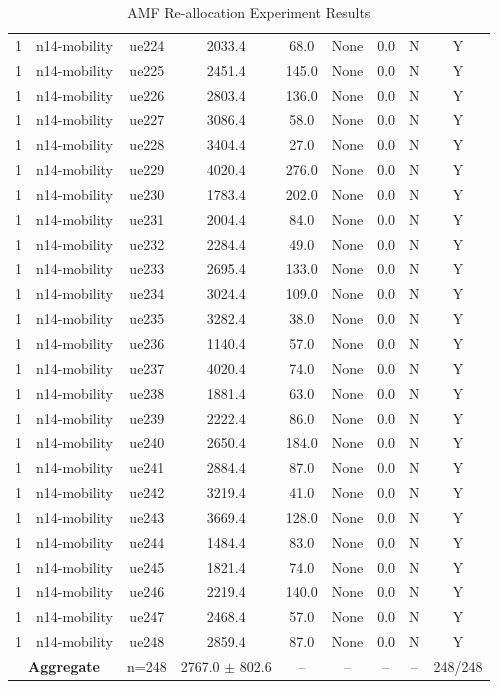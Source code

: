 \begin{table}[ht]
\begin{tabular}{|c|c|c|c|c|c|c|c|c|}
1 & n14-mobility & ue224 & 2033.4 & 68.0 & None & 0.0 & N & Y \\
1 & n14-mobility & ue225 & 2451.4 & 145.0 & None & 0.0 & N & Y \\
1 & n14-mobility & ue226 & 2803.4 & 136.0 & None & 0.0 & N & Y \\
1 & n14-mobility & ue227 & 3086.4 & 58.0 & None & 0.0 & N & Y \\
1 & n14-mobility & ue228 & 3404.4 & 27.0 & None & 0.0 & N & Y \\
1 & n14-mobility & ue229 & 4020.4 & 276.0 & None & 0.0 & N & Y \\
1 & n14-mobility & ue230 & 1783.4 & 202.0 & None & 0.0 & N & Y \\
1 & n14-mobility & ue231 & 2004.4 & 84.0 & None & 0.0 & N & Y \\
1 & n14-mobility & ue232 & 2284.4 & 49.0 & None & 0.0 & N & Y \\
1 & n14-mobility & ue233 & 2695.4 & 133.0 & None & 0.0 & N & Y \\
1 & n14-mobility & ue234 & 3024.4 & 109.0 & None & 0.0 & N & Y \\
1 & n14-mobility & ue235 & 3282.4 & 38.0 & None & 0.0 & N & Y \\
1 & n14-mobility & ue236 & 1140.4 & 57.0 & None & 0.0 & N & Y \\
1 & n14-mobility & ue237 & 4020.4 & 74.0 & None & 0.0 & N & Y \\
1 & n14-mobility & ue238 & 1881.4 & 63.0 & None & 0.0 & N & Y \\
1 & n14-mobility & ue239 & 2222.4 & 86.0 & None & 0.0 & N & Y \\
1 & n14-mobility & ue240 & 2650.4 & 184.0 & None & 0.0 & N & Y \\
1 & n14-mobility & ue241 & 2884.4 & 87.0 & None & 0.0 & N & Y \\
1 & n14-mobility & ue242 & 3219.4 & 41.0 & None & 0.0 & N & Y \\
1 & n14-mobility & ue243 & 3669.4 & 128.0 & None & 0.0 & N & Y \\
1 & n14-mobility & ue244 & 1484.4 & 83.0 & None & 0.0 & N & Y \\
1 & n14-mobility & ue245 & 1821.4 & 74.0 & None & 0.0 & N & Y \\
1 & n14-mobility & ue246 & 2219.4 & 140.0 & None & 0.0 & N & Y \\
1 & n14-mobility & ue247 & 2468.4 & 57.0 & None & 0.0 & N & Y \\
1 & n14-mobility & ue248 & 2859.4 & 87.0 & None & 0.0 & N & Y \\
\multicolumn{2}{|c|}{\textbf{Aggregate}} & n=248 & 2767.0 $\pm$ 802.6 & -- & -- & -- & -- & 248/248 \\
\hline
\end{tabular}
\caption{AMF Re-allocation Experiment Results}
\label{tab:amf_realloc}
\end{table}
